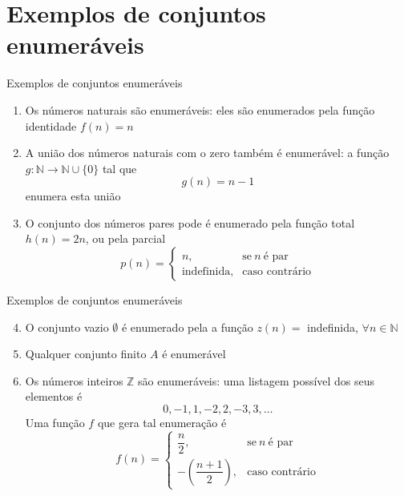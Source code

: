 \section{Exemplos de conjuntos enumeráveis}

\begin{frame}[fragile]{Exemplos de conjuntos enumeráveis}

    \begin{enumerate}
        \item Os números naturais são enumeráveis: eles são enumerados pela função identidade
            $f(n) = n$

        \item A união dos números naturais com o zero também é enumerável: a função 
            $g:\mathbb{N}\to \mathbb{N}\cup \lbrace 0\rbrace$ tal que
            \[
                g(n) = n - 1
            \]
            enumera esta união

        \item O conjunto dos números pares pode é enumerado pela função total $h(n) = 2n$, ou
            pela parcial
            \[
                p(n) = \left\lbrace \begin{array}{ll}
                            n, & \mbox{se}\ n\ \mbox{é par} \\
                            \mbox{indefinida}, & \mbox{caso contrário}
                        \end{array}\right.
            \]
    \end{enumerate}

\end{frame}

\begin{frame}[fragile]{Exemplos de conjuntos enumeráveis}

    \begin{enumerate}
        \setcounter{enumi}{3}
        \item O conjunto vazio $\emptyset$ é enumerado pela a função $z(n) =$ indefinida,
            $\forall n\in \mathbb{N}$ 

        \item Qualquer conjunto finito $A$ é enumerável

        \item Os números inteiros $\mathbb{Z}$ são enumeráveis: uma listagem possível dos seus
        elementos é
        \[
            0, -1, 1, -2, 2, -3, 3, \ldots
        \]
        Uma função $f$ que gera tal enumeração é 
        \[
            f(n) = \left\lbrace \begin{array}{ll}
                        \dfrac{n}{2}, & \mbox{se}\ n\ \mbox{é par} \\
                        -\left(\dfrac{n + 1}{2}\right), & \mbox{caso contrário}
                    \end{array}\right.
        \]

    \end{enumerate}

\end{frame}


